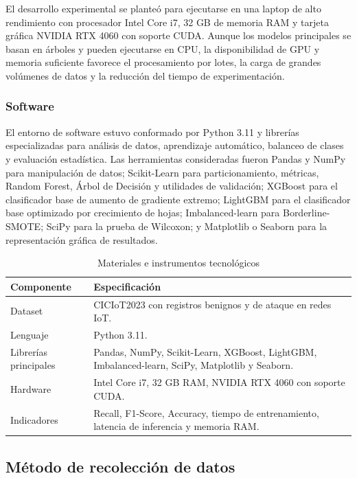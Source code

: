 \documentclass[12pt,a4paper]{article}
\begin{document}
El desarrollo experimental se planteó para ejecutarse en una laptop de alto rendimiento con procesador Intel Core i7, 32 GB de memoria RAM y tarjeta gráfica NVIDIA RTX 4060 con soporte CUDA. Aunque los modelos principales se basan en árboles y pueden ejecutarse en CPU, la disponibilidad de GPU y memoria suficiente favorece el procesamiento por lotes, la carga de grandes volúmenes de datos y la reducción del tiempo de experimentación.

\subsubsection{Software}

El entorno de software estuvo conformado por Python 3.11 y librerías especializadas para análisis de datos, aprendizaje automático, balanceo de clases y evaluación estadística. Las herramientas consideradas fueron Pandas y NumPy para manipulación de datos; Scikit-Learn para particionamiento, métricas, Random Forest, Árbol de Decisión y utilidades de validación; XGBoost para el clasificador base de aumento de gradiente extremo; LightGBM para el clasificador base optimizado por crecimiento de hojas; Imbalanced-learn para Borderline-SMOTE; SciPy para la prueba de Wilcoxon; y Matplotlib o Seaborn para la representación gráfica de resultados.

\begin{table}[H]
\centering
\caption{Materiales e instrumentos tecnológicos}
\begin{tabular}{p{4cm}p{8.5cm}}
\toprule
\textbf{Componente} & \textbf{Especificación} \\
\midrule
Dataset & CICIoT2023 con registros benignos y de ataque en redes IoT. \\
Lenguaje & Python 3.11. \\
Librerías principales & Pandas, NumPy, Scikit-Learn, XGBoost, LightGBM, Imbalanced-learn, SciPy, Matplotlib y Seaborn. \\
Hardware & Intel Core i7, 32 GB RAM, NVIDIA RTX 4060 con soporte CUDA. \\
Indicadores & Recall, F1-Score, Accuracy, tiempo de entrenamiento, latencia de inferencia y memoria RAM. \\
\bottomrule
\end{tabular}
\end{table}

\subsection{Método de recolección de datos}
\end{document}
